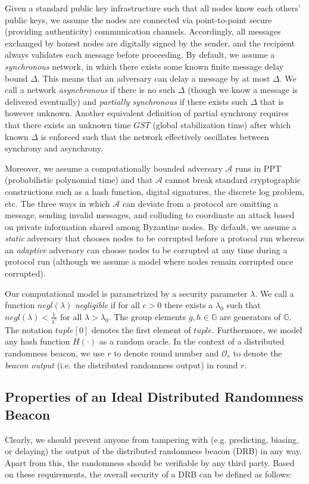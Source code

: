 \documentclass[letterpaper,twocolumn,10pt]{article}
\theoremstyle{definition}
\theoremstyle{remark}
\begin{document}
Given a standard public key infrastructure such that all nodes know each others' public keys, we assume the nodes are connected via point-to-point secure (providing authenticity) communication channels. Accordingly, all messages exchanged by honest nodes are digitally signed by the sender, and the recipient always validates each message before proceeding. By default, we assume a \textit{synchronous} network, in which there exists some known finite message delay bound $\Delta$. This means that an adversary can delay a message by at most $\Delta$. We call a network \textit{asynchronous} if there is no such $\Delta$ (though we know a message is delivered eventually) and \textit{partially synchronous} if there exists such $\Delta$ that is however unknown. Another equivalent definition of partial synchrony \cite{dwork1988consensus} requires that there exists an unknown time $GST$ (global stabilization time) after which known $\Delta$ is enforced such that the network effectively oscillates between synchrony and asynchrony.

Moreover, we assume a computationally bounded adversary $\mathcal{A}$ runs in PPT (probabilistic polynomial time) and that $\mathcal{A}$ cannot break standard cryptographic constructions such as a hash function, digital signatures, the discrete log problem, etc. The three ways in which $\mathcal{A}$ can deviate from a protocol are omitting a message, sending invalid messages, and colluding to coordinate an attack based on private information shared among Byzantine nodes. By default, we assume a \textit{static} adversary that chooses nodes to be corrupted before a protocol run whereas an \textit{adaptive} adversary can choose nodes to be corrupted at any time during a protocol run (although we assume a model where nodes remain corrupted once corrupted).

Our computational model is parametrized by a security parameter $\lambda$. We call a function $negl(\lambda)$ \textit{negligible} if for all $c > 0$ there exists a $\lambda_0$ such that $negl(\lambda) < \frac{1}{\lambda^c}$ for all $\lambda > \lambda_0$. The group elements $g, h \in \mathbb{G}$ are generators of $\mathbb{G}$. The notation $tuple[0]$ denotes the first element of $tuple$. Furthermore, we model any hash function $H(\cdot)$ as a random oracle. In the context of a distributed randomness beacon, we use $r$ to denote round number and $\mathcal{O}_r$ to denote the \textit{beacon output} (i.e. the distributed randomness output) in round $r$.

\subsection{Properties of an Ideal Distributed Randomness Beacon}
Clearly, we should prevent anyone from tampering with (e.g. predicting, biasing, or delaying) the output of the distributed randomness beacon (DRB) in any way. Apart from this, the randomness should be verifiable by any third party. Based on these requirements, the overall security of a DRB can be defined as follows:
\end{document}

